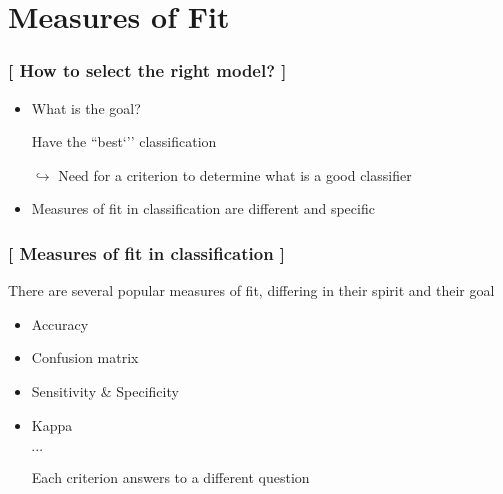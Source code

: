\documentclass[xcolor=x11names,compress, aspectratio=169]{beamer}
\renewcommand{\(}{\begin{columns}}
\renewcommand{\)}{\end{columns}}
\newcommand{\<}[1]{\begin{column}{#1}}
\renewcommand{\>}{\end{column}}
\begin{document}
%


\section{Measures of Fit}

\begin{frame} %
\frametitle{\textcolor{brique}{[ How to select the right model?  ]}}
\pause
\begin{itemize}[<+->]
  \item What is the goal?
  \item[] Have the ``best`'' classification
  \item[$\hookrightarrow$] Need for a criterion to determine what is a good classifier
  \item Measures of fit in classification are different and specific
\end{itemize}
\end{frame}

\begin{frame} %
\frametitle{\textcolor{brique}{[ Measures of fit in classification ]}}
There are several popular measures of fit, differing in their spirit and their goal
\pause
\begin{itemize}[<+->]
  \item Accuracy
  \item Confusion matrix
  \item Sensitivity  \&  Specificity
  \item Kappa
  \item[]$\cdots$
  \item[] Each criterion answers to a different question
\end{itemize}
\end{frame}
\end{document}
